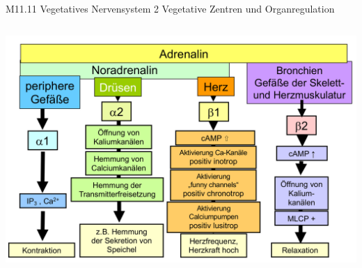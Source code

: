 \documentclass{beamer}
\begin{document}
\begin{frame}{M11.11 Vegetatives Nervensystem 2 Vegetative Zentren und Organregulation}

\begin{columns}[c]

\begin{column}{7cm}

    \begin{center}
        \includegraphics[width=\textwidth]{adrenerge_systeme.png}
    \end{center}

\end{column}

\pause


\end{columns}
\end{frame}
\end{document}
